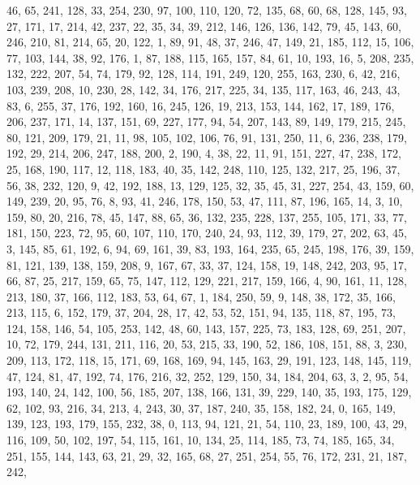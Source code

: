 \begin{DoxyCode}
       46, 65, 241, 128, 33, 254, 230, 97, 100, 110, 120, 72, 135, 68, 60, 68, 128, 145, 93, 27, 171, 17, 214, 42,
       237, 22, 35, 34, 39, 212, 146, 126, 136, 142, 79, 45, 143, 60, 246, 210, 81, 214, 65, 20, 122, 1, 89, 91, 48,
       37, 246, 47, 149, 21, 185, 112, 15, 106, 77, 103, 144, 38, 92, 176, 1, 87, 188, 115, 165, 157, 84, 61, 10,
       193, 16, 5, 208, 235, 132, 222, 207, 54, 74, 179, 92, 128, 114, 191, 249, 120, 255, 163, 230, 6, 42, 216,
       103, 239, 208, 10, 230, 28, 142, 34, 176, 217, 225, 34, 135, 117, 163, 46, 243, 43, 83, 6, 255, 37, 176, 192,
       160, 16, 245, 126, 19, 213, 153, 144, 162, 17, 189, 176, 206, 237, 171, 14, 137, 151, 69, 227, 177, 94, 54,
       207, 143, 89, 149, 179, 215, 245, 80, 121, 209, 179, 21, 11, 98, 105, 102, 106, 76, 91, 131, 250, 11, 6, 236,
       238, 179, 192, 29, 214, 206, 247, 188, 200, 2, 190, 4, 38, 22, 11, 91, 151, 227, 47, 238, 172, 25, 168,
       190, 117, 12, 118, 183, 40, 35, 142, 248, 110, 125, 132, 217, 25, 196, 37, 56, 38, 232, 120, 9, 42, 192, 188,
       13, 129, 125, 32, 35, 45, 31, 227, 254, 43, 159, 60, 149, 239, 20, 95, 76, 8, 93, 41, 246, 178, 150, 53, 47,
       111, 87, 196, 165, 14, 3, 10, 159, 80, 20, 216, 78, 45, 147, 88, 65, 36, 132, 235, 228, 137, 255, 105, 171,
       33, 77, 181, 150, 223, 72, 95, 60, 107, 110, 170, 240, 24, 93, 112, 39, 179, 27, 202, 63, 45, 3, 145, 85,
       61, 192, 6, 94, 69, 161, 39, 83, 193, 164, 235, 65, 245, 198, 176, 39, 159, 81, 121, 139, 138, 159, 208, 9,
       167, 67, 33, 37, 124, 158, 19, 148, 242, 203, 95, 17, 66, 87, 25, 217, 159, 65, 75, 147, 112, 129, 221, 217,
       159, 166, 4, 90, 161, 11, 128, 213, 180, 37, 166, 112, 183, 53, 64, 67, 1, 184, 250, 59, 9, 148, 38, 172, 35,
       166, 213, 115, 6, 152, 179, 37, 204, 28, 17, 42, 53, 52, 151, 94, 135, 118, 87, 195, 73, 124, 158, 146, 54,
       105, 253, 142, 48, 60, 143, 157, 225, 73, 183, 128, 69, 251, 207, 10, 72, 179, 244, 131, 211, 116, 20, 53,
       215, 33, 190, 52, 186, 108, 151, 88, 3, 230, 209, 113, 172, 118, 15, 171, 69, 168, 169, 94, 145, 163, 29,
       191, 123, 148, 145, 119, 47, 124, 81, 47, 192, 74, 176, 216, 32, 252, 129, 150, 34, 184, 204, 63, 3, 2, 95,
       54, 193, 140, 24, 142, 100, 56, 185, 207, 138, 166, 131, 39, 229, 140, 35, 193, 175, 129, 62, 102, 93, 216,
       34, 213, 4, 243, 30, 37, 187, 240, 35, 158, 182, 24, 0, 165, 149, 139, 123, 193, 179, 155, 232, 38, 0, 113,
       94, 121, 21, 54, 110, 23, 189, 100, 43, 29, 116, 109, 50, 102, 197, 54, 115, 161, 10, 134, 25, 114, 185, 73,
       74, 185, 165, 34, 251, 155, 144, 143, 63, 21, 29, 32, 165, 68, 27, 251, 254, 55, 76, 172, 231, 21, 187, 242,

\end{DoxyCode}
